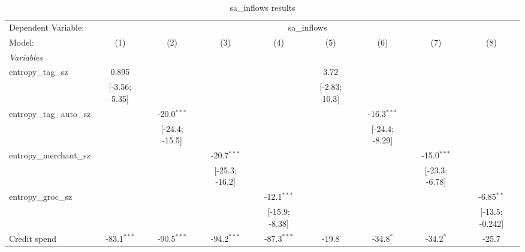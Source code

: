 
\begin{table}[htbp]
   \centering
   \tiny
   \begin{threeparttable}[b]
      \caption{sa\_inflows results}
      \begin{tabular}{lcccccccc}
         \tabularnewline \midrule \midrule
         Dependent Variable: & \multicolumn{8}{c}{sa\_inflows}\\
         Model:                    & (1)             & (2)             & (3)             & (4)             & (5)             & (6)             & (7)             & (8)\\  
         \midrule
         \emph{Variables}\\
         entropy\_tag\_sz          & 0.895           &                 &                 &                 & 3.72            &                 &                 &   \\   
                                   & [-3.56; 5.35]   &                 &                 &                 & [-2.83; 10.3]   &                 &                 &   \\   
         entropy\_tag\_auto\_sz    &                 & -20.0$^{***}$   &                 &                 &                 & -16.3$^{***}$   &                 &   \\   
                                   &                 & [-24.4; -15.5]  &                 &                 &                 & [-24.4; -8.29]  &                 &   \\   
         entropy\_merchant\_sz     &                 &                 & -20.7$^{***}$   &                 &                 &                 & -15.0$^{***}$   &   \\   
                                   &                 &                 & [-25.3; -16.2]  &                 &                 &                 & [-23.3; -6.78]  &   \\   
         entropy\_groc\_sz         &                 &                 &                 & -12.1$^{***}$   &                 &                 &                 & -6.85$^{**}$\\   
                                   &                 &                 &                 & [-15.9; -8.38]  &                 &                 &                 & [-13.5; -0.242]\\   
         Credit spend              & -83.1$^{***}$   & -90.5$^{***}$   & -94.2$^{***}$   & -87.3$^{***}$   & -19.8           & -34.8$^{*}$     & -34.2$^{*}$     & -25.7\\   

\end{tabular}
\end{threeparttable}
\end{table}
